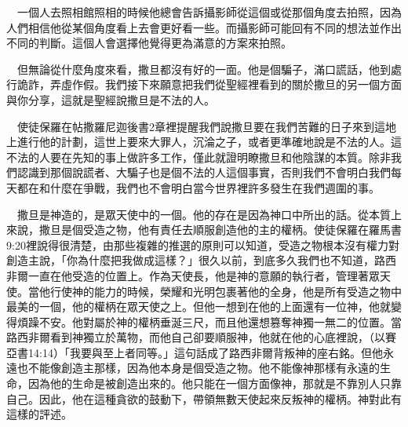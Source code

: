 \documentclass{book}
\begin{document}
\begin{center}
\noindent{}
\end{center}

　一個人去照相館照相的時候他總會告訴攝影師從這個或從那個角度去拍照，因為人們相信他從某個角度看上去會更好看一些。而攝影師可能回有不同的想法並作出不同的判斷。這個人會選擇他覺得更為滿意的方案來拍照。

　但無論從什麼角度來看，撒旦都沒有好的一面。他是個騙子，滿口謊話，他到處行詭詐，弄虛作假。我們接下來願意把我們從聖經裡看到的關於撒旦的另一個方面與你分享，這就是聖經說撒旦是不法的人。

　使徒保羅在帖撒羅尼迦後書2章裡提醒我們說撒旦要在我們苦難的日子來到這地上進行他的計劃，這世上要來大罪人，沉淪之子，或者更準確地說是不法的人。這不法的人要在先知的事上做許多工作，僅此就證明瞭撒旦和他陰謀的本質。除非我們認識到那個說謊者、大騙子也是個不法的人這個事實，否則我們不會明白我們每天都在和什麼在爭戰，我們也不會明白當今世界裡許多發生在我們週圍的事。

　撒旦是神造的，是眾天使中的一個。他的存在是因為神口中所出的話。從本質上來說，撒旦是個受造之物，他有責任去順服創造他的主的權柄。使徒保羅在羅馬書9:20裡說得很清楚，由那些複雜的推選的原則可以知道，受造之物根本沒有權力對創造主說，「你為什麼把我做成這樣？」很久以前，到底多久我們也不知道，路西非爾一直在他受造的位置上。作為天使長，他是神的意願的執行者，管理著眾天使。當他行使神的能力的時候，榮耀和光明包裹著他的全身，他是所有受造之物中最美的一個，他的權柄在眾天使之上。但他一想到在他的上面還有一位神，他就變得煩躁不安。他對屬於神的權柄垂涎三尺，而且他還想篡奪神獨一無二的位置。當路西非爾看到神獨立於萬物，而他自己卻要順服神，他就在他的心底裡說，（以賽亞書14:14）「我要與至上者同等。」這句話成了路西非爾背叛神的座右銘。但他永遠也不能像創造主那樣，因為他本身是個受造之物。他不能像神那樣有永遠的生命，因為他的生命是被創造出來的。他只能在一個方面像神，那就是不靠別人只靠自己。因此，他在這種貪欲的鼓動下，帶領無數天使起來反叛神的權柄。神對此有這樣的評述。
\end{document}
